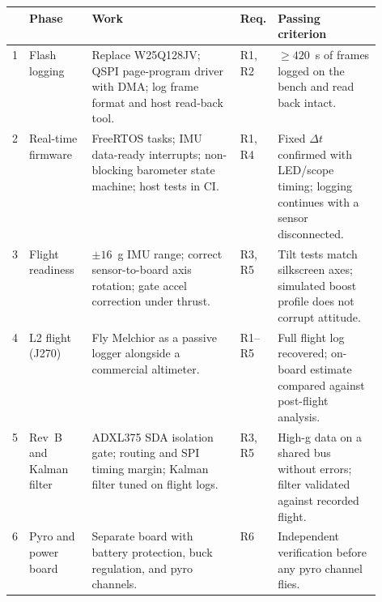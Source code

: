 \documentclass[10pt,letterpaper]{article}
\begin{document}
\vspace{2pt}
{\small
\renewcommand{\arraystretch}{1.15}
\begin{tabularx}{\linewidth}{@{}c>{\raggedright\arraybackslash}p{0.17\linewidth}>{\raggedright\arraybackslash}X>{\raggedright\arraybackslash}p{0.07\linewidth}>{\raggedright\arraybackslash}p{0.29\linewidth}@{}}
\toprule
& \textbf{Phase} & \textbf{Work} & \textbf{Req.} & \textbf{Passing criterion} \\
\midrule
1 & Flash logging &
  Replace W25Q128JV; QSPI page-program driver with DMA; log frame format and host read-back tool. &
  R1, R2 &
  $\geq 420$~s of frames logged on the bench and read back intact. \\
2 & Real-time firmware &
  FreeRTOS tasks; IMU data-ready interrupts; non-blocking barometer state machine; host tests in CI. &
  R1, R4 &
  Fixed $\Delta t$ confirmed with LED/scope timing; logging continues with a sensor disconnected. \\
3 & Flight readiness &
  $\pm16$~g IMU range; correct sensor-to-board axis rotation; gate accel correction under thrust. &
  R3, R5 &
  Tilt tests match silkscreen axes; simulated boost profile does not corrupt attitude. \\
4 & L2 flight (J270) &
  Fly Melchior as a passive logger alongside a commercial altimeter. &
  R1--R5 &
  Full flight log recovered; on-board estimate compared against post-flight analysis. \\
5 & Rev~B and Kalman filter &
  ADXL375 SDA isolation gate; routing and SPI timing margin; Kalman filter tuned on flight logs. &
  R3, R5 &
  High-g data on a shared bus without errors; filter validated against recorded flight. \\
6 & Pyro and power board &
  Separate board with battery protection, buck regulation, and pyro channels. &
  R6 &
  Independent verification before any pyro channel flies. \\
\bottomrule
\end{tabularx}}
\end{document}
